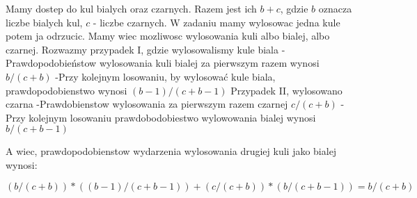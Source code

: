 \medskip
{} 
\medskip
Mamy dostep do kul bialych oraz czarnych. Razem jest ich $b+c$, gdzie  $b$ oznacza liczbe bialych kul, $c$ - liczbe czarnych.
W zadaniu mamy wylosowac jedna kule potem ja odrzucic. Mamy wiec mozliwosc wylosowania kuli albo bialej, albo czarnej.
Rozwazmy przypadek I, gdzie wylosowalismy kule biala
  -Prawdopodobieństow wylosowania kuli bialej za pierwszym razem wynosi $b/(c+b)$
  -Przy kolejnym losowaniu, by wylosować kule biala, prawdopodobienstwo wynosi $(b-1)/(c+b-1)$
Przypadek II, wylosowano czarna
  -Prawdobienstow wylosowania za pierwszym razem czarnej $c/(c+b)$
  -Przy kolejnym losowaniu prawdobodobiestwo wylowowania bialej wynosi $b/(c+b-1)$
  
A wiec, prawdopodobienstow wydarzenia wylosowania drugiej kuli jako bialej wynosi:
\begin{center}
      $(b/(c+b))*((b-1)/(c+b-1)) + (c/(c+b))*(b/(c+b-1)) = b/(c+b)$
\end{center}
